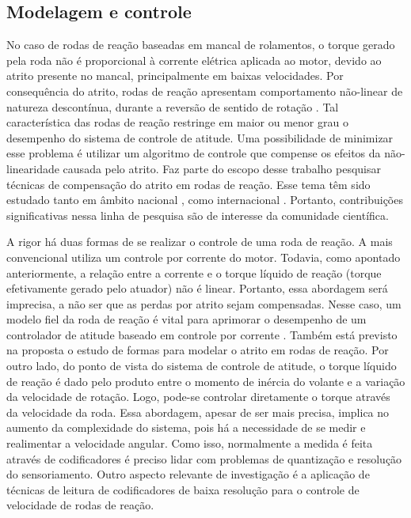   \subsection{Modelagem e controle}\label{sec:algoritimos}

No caso de rodas de reação baseadas em mancal de rolamentos, o torque gerado pela roda não é proporcional à corrente elétrica aplicada ao motor, devido ao atrito presente no mancal, principalmente em baixas velocidades. Por consequência do atrito, rodas de reação apresentam comportamento não-linear de natureza descontínua, durante a reversão de sentido de rotação \cite{wertz1978spacecraft}. Tal característica das rodas de reação restringe em maior ou menor grau o desempenho do sistema de controle de atitude. Uma possibilidade de minimizar esse problema é utilizar um algoritmo de controle que compense os efeitos da não-linearidade causada pelo atrito. Faz parte do escopo desse trabalho pesquisar técnicas de compensação do atrito em rodas de reação. Esse tema têm sido estudado tanto em âmbito nacional \cite{carrara2010comparaccao,carrara2011speed}, como internacional \cite{stetson1993reaction}. Portanto, contribuições significativas nessa linha de pesquisa são de interesse da comunidade científica.

A rigor há duas formas de se realizar o controle de uma roda de reação. A mais convencional utiliza um controle por corrente do motor. Todavia, como apontado anteriormente, a relação entre a corrente e o torque líquido de reação (torque efetivamente gerado pelo atuador) não é linear. Portanto, essa abordagem será imprecisa, a não ser que as perdas por atrito sejam compensadas.  Nesse caso, um modelo fiel da roda de reação é vital para aprimorar o desempenho de um controlador de atitude baseado em controle por corrente \cite{carrara2010comparaccao}. Também está previsto na proposta o estudo de formas para modelar o atrito em rodas de reação. Por outro lado, do ponto de vista do sistema de controle de atitude, o torque líquido de reação é dado pelo produto entre o momento de inércia do volante e a variação da velocidade de rotação. Logo, pode-se controlar diretamente o torque através da velocidade da roda. Essa abordagem, apesar de ser mais precisa, implica no aumento da complexidade do sistema, pois há a necessidade de se medir e realimentar a velocidade angular. Como isso, normalmente a medida é feita através de codificadores é preciso lidar com problemas de quantização e resolução do sensoriamento. Outro aspecto relevante de investigação é a aplicação de técnicas de leitura de codificadores de baixa resolução \cite{petrella2007speed} para o controle de velocidade de rodas de reação.


